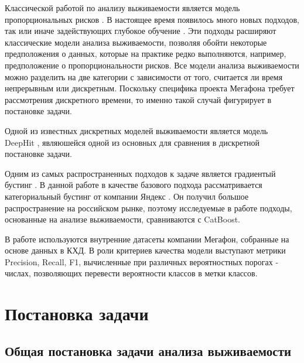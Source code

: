 \documentclass[a4paper,14pt,oneside,openany]{memoir}
\begin{document}
Классической работой по анализу выживаемости является модель пропорциональных рисков \cite{Cox1972}. В настоящее время появилось много новых подходов, так или иначе задействующих глубокое обучение \cite{Wiegrebe2024}. Эти подходы расширяют классические модели анализа выживаемости, позволяя обойти некоторые предположения о данных, которые на практике редко выполняются, например, предположение о пропорциональности рисков. Все модели анализа выживаемости можно разделить на две категории с зависимости от того, считается ли время непрерывным или дискретным. Поскольку специфика проекта Мегафона требует рассмотрения дискретного времени, то именно такой случай фигурирует в постановке задачи. 

Одной из известных дискретных моделей выживаемости является модель DeepHit \cite{Lee2018}, являюшейся одной из основных для сравнения в дискретной постановке задачи. 

Одним из самых распространенных подходов к задаче является градиентый бустинг \cite{Ahmad2019}.  В данной работе в качестве базового подхода рассматривается категориальный бустинг от компании Яндекс \cite{Dorogush2018}. Он получил большое распространение на российском рынке, поэтому исследуемые в работе подходы, основанные на анализе выживаемости, сравниваются с CatBoost.

В работе используются внутренние датасеты компании Мегафон, собранные на основе данных в КХД. В роли критериев качества модели выступают метрики Precision, Recall, F1, вычисленные при различных вероятностных порогах - числах, позволяющих перевести вероятности классов в метки классов.


\setcounter{chapter}{0}




\chapter{Постановка задачи}

\section{Общая постановка задачи анализа выживаемости}
\end{document}
